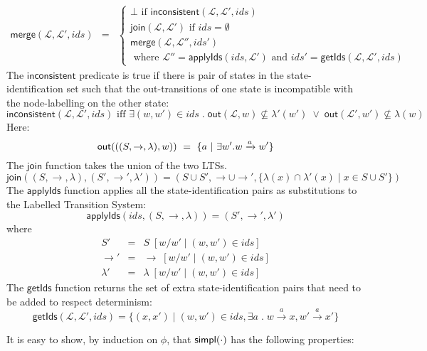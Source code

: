 \begin{eqnarray*}
  \mathsf{merge}(\mathcal{L}, \mathcal{L}', ids) 
     & = & 
  \begin{cases}
    \bot \text{ if } \mathsf{inconsistent}(\mathcal{L}, \mathcal{L}', ids)  \\
    \mathsf{join}(\mathcal{L}, \mathcal{L}') \text{ if } ids = \emptyset  \\
    \mathsf{merge}(\mathcal{L}, \mathcal{L}'', ids')  \\
    \text{ where }  \mathcal{L}'' = \mathsf{applyIds}(ids, \mathcal{L}') \text{ and } ids' = \mathsf{getIds}(\mathcal{L}, \mathcal{L}', ids)
  \end{cases}
\end{eqnarray*}
The $\mathsf{inconsistent}$ predicate is true if there is pair of states in the state-identification set such that the out-transitions of one state is incompatible with the node-labelling on the other state:
\[
\mathsf{inconsistent}(\mathcal{L}, \mathcal{L}', ids) \text{ iff } \exists (w,w') \in ids \; . \; \mathsf{out}(\mathcal{L},w) \nsubseteq \lambda'(w') \; \lor \; \mathsf{out}(\mathcal{L}',w') \nsubseteq \lambda(w)
\]
 \NI Here:
\[
  \mathsf{out}(((S,\rightarrow,\lambda),w)) 
     \ =\  \{ a \ | \  \exists w' . w \xrightarrow{a} w'\} 
\]
The $\mathsf{join}$ function takes the union of the two LTSs.
\[
\mathsf{join}((S, \rightarrow,\lambda), (S', \rightarrow', \lambda')) = (S \cup S', \rightarrow \cup \rightarrow', \{\lambda(x) \cap \lambda'(x) \; | \; x \in S \cup S'\})
\]
The $\mathsf{applyIds}$ function applies all the state-identification pairs as substitutions to the Labelled Transition System:
\[
\mathsf{applyIds}(ids, (S, \rightarrow, \lambda)) = (S', \rightarrow', \lambda')
\]
where
\begin{eqnarray*}
S' & = & S \; [ w / w' \; | \; (w,w') \in ids] \\
\rightarrow' & = & \rightarrow \; [ w / w' \; | \; (w,w') \in ids] \\
\lambda' & = & \lambda \; [ w / w' \; | \; (w,w') \in ids]
\end{eqnarray*}
The $\mathsf{getIds}$ function returns the set of extra state-identification pairs that need to be added to respect determinism:
\[
\mathsf{getIds}(\mathcal{L}, \mathcal{L}', ids) = \{(x,x') \; | \; (w,w') \in ids, \exists a \; . \; w \xrightarrow{a} x, w' \xrightarrow{a} x'\}
\]

\NI It is easy to show, by induction on $\phi$, that $\mathsf{simpl}(\cdot)$ has the following properties:

